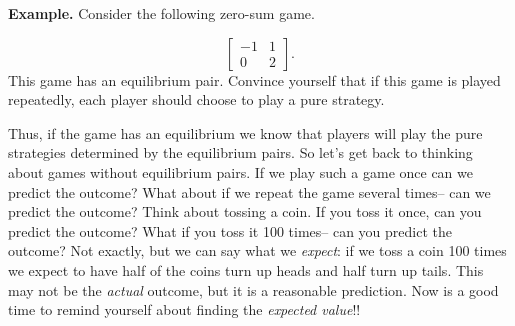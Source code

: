 {\bf Example.} Consider the following zero-sum game.

\[\left[\begin{matrix}
-1&1\\
0&2

\end{matrix}\right].\]
This game has an equilibrium pair. Convince yourself that if this game is played repeatedly, each player should  choose to play a pure strategy.

Thus, if the game has an equilibrium we know that players will play the pure strategies determined by the equilibrium pairs. So let's get back to thinking about games without equilibrium pairs. If we play such a game once can we predict the outcome? What about if we repeat the game several times-- can we predict the outcome? Think about tossing a coin. If you toss it once, can you predict the outcome? What if you toss it 100 times-- can you predict the outcome? Not exactly, but we can say what we {\it expect}: if we toss a coin 100 times we expect to have half of the coins turn up heads and half turn up tails. This may not be the {\it actual} outcome, but it is a reasonable prediction. Now is a good time to remind yourself about finding the {\it expected value}!!
